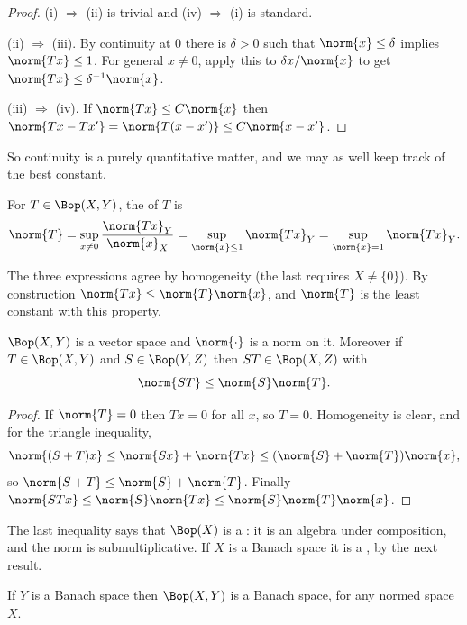 \begin{proof}
	(i) $\Rightarrow$ (ii) is trivial and (iv) $\Rightarrow$ (i) is standard.

	(ii) $\Rightarrow$ (iii). By continuity at $0$ there is $\delta > 0$ such that $\norm{x} \leq \delta$ implies $\norm{Tx} \leq 1$. For general $x \neq 0$, apply this to $\delta x / \norm{x}$ to get $\norm{Tx} \leq \delta^{-1} \norm{x}$.

	(iii) $\Rightarrow$ (iv). If $\norm{Tx} \leq C\norm{x}$ then $\norm{Tx - Tx'} = \norm{T(x - x')} \leq C \norm{x - x'}$.
\end{proof}

So continuity is a purely quantitative matter, and we may as well keep track of the best constant.

\begin{definition}
	For $T \in \Bop(X,Y)$, the  of $T$ is
	$$\norm{T} = \sup_{x \neq 0} \frac{\norm{Tx}_Y}{\norm{x}_X} = \sup_{\norm{x} \leq 1} \norm{Tx}_Y = \sup_{\norm{x} = 1} \norm{Tx}_Y.$$
\end{definition}

The three expressions agree by homogeneity (the last requires $X \neq \{0\}$). By construction $\norm{Tx} \leq \norm{T}\norm{x}$, and $\norm{T}$ is the least constant with this property.

\begin{proposition}
	$\Bop(X,Y)$ is a vector space and $\norm{\cdot}$ is a norm on it. Moreover if $T \in \Bop(X,Y)$ and $S \in \Bop(Y,Z)$ then $ST \in \Bop(X,Z)$ with
	$$\norm{ST} \leq \norm{S} \norm{T}.$$
\end{proposition}

\begin{proof}
	If $\norm{T} = 0$ then $Tx = 0$ for all $x$, so $T = 0$. Homogeneity is clear, and for the triangle inequality,
	$$\norm{(S+T)x} \leq \norm{Sx} + \norm{Tx} \leq (\norm{S} + \norm{T})\norm{x},$$
	so $\norm{S+T} \leq \norm{S} + \norm{T}$. Finally $\norm{STx} \leq \norm{S}\norm{Tx} \leq \norm{S}\norm{T}\norm{x}$.
\end{proof}

The last inequality says that $\Bop(X)$ is a : it is an algebra under composition, and the norm is submultiplicative. If $X$ is a Banach space it is a , by the next result.

\begin{theorem}
	If $Y$ is a Banach space then $\Bop(X,Y)$ is a Banach space, for any normed space $X$.
\end{theorem}


